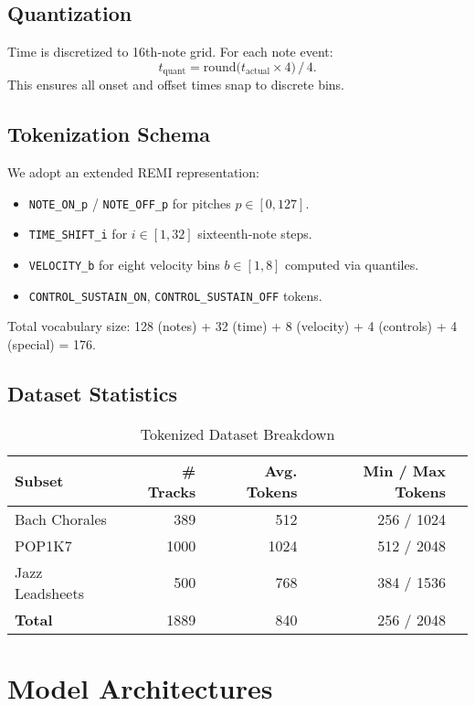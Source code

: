 \subsection{Quantization}
Time is discretized to 16th‐note grid. For each note event:
\[
  t_{\text{quant}} = \mathrm{round}\!\bigl(t_{\text{actual}} \times 4 \bigr) \,/\,4.
\]
This ensures all onset and offset times snap to discrete bins.

\subsection{Tokenization Schema}
We adopt an extended REMI representation:
\begin{itemize}
  \item \texttt{NOTE\_ON\_p} / \texttt{NOTE\_OFF\_p} for pitches $p\in[0,127]$.
  \item \texttt{TIME\_SHIFT\_i} for $i\in[1,32]$ sixteenth‐note steps.
  \item \texttt{VELOCITY\_b} for eight velocity bins $b\in[1,8]$ computed via quantiles.
  \item \texttt{CONTROL\_SUSTAIN\_ON}, \texttt{CONTROL\_SUSTAIN\_OFF} tokens.
\end{itemize}
Total vocabulary size: 128 (notes) + 32 (time) + 8 (velocity) + 4 (controls) + 4 (special) = 176.

\subsection{Dataset Statistics}
\begin{table}[ht]
  \centering
  \begin{tabular}{lrrrr}
    \toprule
    \textbf{Subset} & \# Tracks & Avg. Tokens & Min / Max Tokens \\
    \midrule
    Bach Chorales   & 389 & 512 & 256 / 1024 \\
    POP1K7          & 1000 & 1024 & 512 / 2048 \\
    Jazz Leadsheets & 500 & 768 & 384 / 1536 \\
    \midrule
    \textbf{Total}  & 1889 & 840 & 256 / 2048 \\
    \bottomrule
  \end{tabular}
  \caption{Tokenized Dataset Breakdown}
\end{table}

\newpage
\section{Model Architectures}

